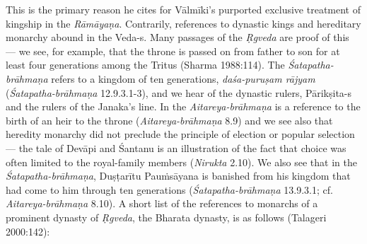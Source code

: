 This is the primary reason he cites for Vālmīki’s purported exclusive treatment of kingship in the {\sl Rāmāyaṇa}. Contrarily, references to dynastic kings and hereditary monarchy abound in the Veda-s. Many passages of the {\sl Ṛgveda} are proof of this --- we see, for example, that the throne is passed on from father to son for at least four generations among the Tritus (Sharma 1988:114). The {\sl Śatapatha-brāhmaṇa} refers to a kingdom of ten generations, {\sl daśa-puruṣam rājyam} ({\sl Śatapatha-brāhmaṇa} 12.9.3.1-3), and we hear of the dynastic rulers, \hbox{Pārikṣita-s} and the rulers of the Janaka’s line. In the {\sl Aitareya-brāhmaṇa}  is a reference to the birth of an heir to the throne ({\sl Aitareya-brāhmaṇa} 8.9) and we see also that heredity monarchy did not preclude the principle of election or popular selection--- the tale of Devāpi and Śantanu is an illustration of the fact that choice was often limited to the royal-family members ({\sl Nirukta} 2.10). We also see that in the {\sl Śatapatha-brāhmaṇa},
 Duṣṭarītu Pauṁsāyana is banished from his kingdom that had come to him through ten generations ({\sl Śatapatha-brāhmaṇa} 13.9.3.1; cf. {\sl Aitareya-brāhmaṇa} 8.10). A short list of the references to monarchs of a prominent dynasty of {\sl Ṛgveda}, the Bharata dynasty, is as follows (Talageri 2000:142):
